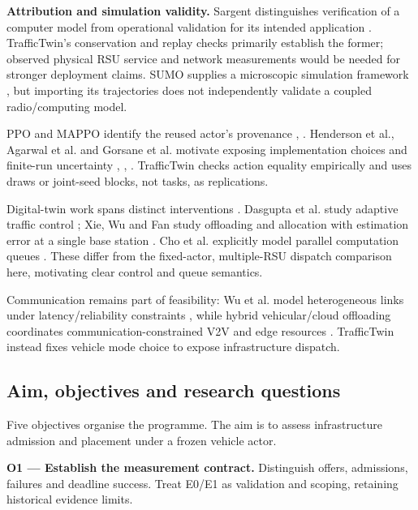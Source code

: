 \documentclass[12pt,a4paper]{article}
\begin{document}
\textbf{Attribution and simulation validity.} Sargent distinguishes verification of a computer model from operational validation for its intended application \cite{ref21}. TrafficTwin's conservation and replay checks primarily establish the former; observed physical RSU service and network measurements would be needed for stronger deployment claims. SUMO supplies a microscopic simulation framework \cite{ref22}, but importing its trajectories does not independently validate a coupled radio/computing model.

PPO and MAPPO identify the reused actor's provenance \cite{ref23}, \cite{ref24}. Henderson et al., Agarwal et al. and Gorsane et al. motivate exposing implementation choices and finite-run uncertainty \cite{ref25}, \cite{ref26}, \cite{ref27}. TrafficTwin checks action equality empirically and uses draws or joint-seed blocks, not tasks, as replications.

Digital-twin work spans distinct interventions \cite{ref28}. Dasgupta et al. study adaptive traffic control \cite{ref29}; Xie, Wu and Fan study offloading and allocation with estimation error at a single base station \cite{ref30}. Cho et al. explicitly model parallel computation queues \cite{ref31}. These differ from the fixed-actor, multiple-RSU dispatch comparison here, motivating clear control and queue semantics.

Communication remains part of feasibility: Wu et al. model heterogeneous links under latency/reliability constraints \cite{ref6}, while hybrid vehicular/cloud offloading coordinates communication-constrained V2V and edge resources \cite{ref32}. TrafficTwin instead fixes vehicle mode choice to expose infrastructure dispatch.

\FloatBarrier
\subsection{Aim, objectives and research questions}\label{sec:1.3}

Five objectives organise the programme. The aim is to assess infrastructure admission and placement under a frozen vehicle actor.

\textbf{O1 --- Establish the measurement contract.} Distinguish offers, admissions, failures and deadline success. Treat E0/E1 as validation and scoping, retaining historical evidence limits.
\end{document}
